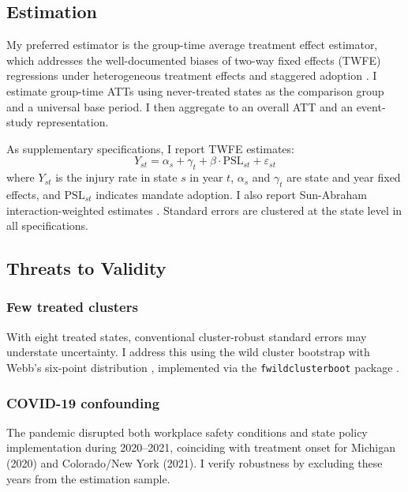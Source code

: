 \documentclass[12pt]{article}
\begin{document}
\subsection{Estimation}

My preferred estimator is the \citet{callaway2021} group-time average treatment effect estimator, which addresses the well-documented biases of two-way fixed effects (TWFE) regressions under heterogeneous treatment effects and staggered adoption \citep{goodmanbacon2021, dechaisemartin2020}. I estimate group-time ATTs using never-treated states as the comparison group and a universal base period. I then aggregate to an overall ATT and an event-study representation.

As supplementary specifications, I report TWFE estimates:
\begin{equation}
Y_{st} = \alpha_s + \gamma_t + \beta \cdot \text{PSL}_{st} + \varepsilon_{st}
\label{eq:twfe}
\end{equation}
where $Y_{st}$ is the injury rate in state $s$ in year $t$, $\alpha_s$ and $\gamma_t$ are state and year fixed effects, and $\text{PSL}_{st}$ indicates mandate adoption. I also report Sun-Abraham interaction-weighted estimates \citep{sun2021}. Standard errors are clustered at the state level in all specifications.

\subsection{Threats to Validity}

\subsubsection*{Few treated clusters} With eight treated states, conventional cluster-robust standard errors may understate uncertainty. I address this using the wild cluster bootstrap with Webb's six-point distribution \citep{webb2014}, implemented via the \texttt{fwildclusterboot} package \citep{fischer2021}.

\subsubsection*{COVID-19 confounding} The pandemic disrupted both workplace safety conditions and state policy implementation during 2020--2021, coinciding with treatment onset for Michigan (2020) and Colorado/New York (2021). I verify robustness by excluding these years from the estimation sample.
\end{document}
